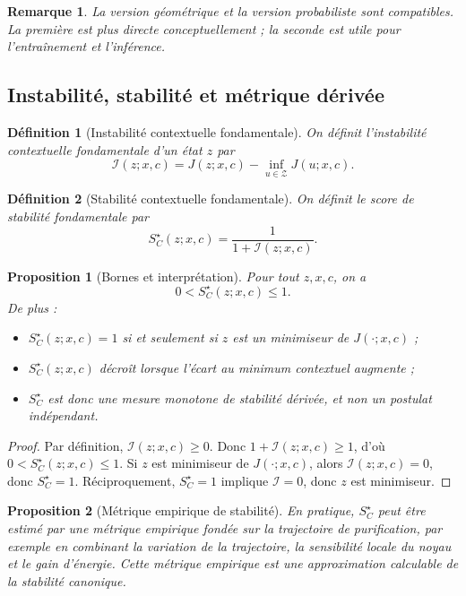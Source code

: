 \documentclass[11pt,a4paper]{article}
\newtheorem{definition}{Définition}[section]
\newtheorem{proposition}{Proposition}[section]
\newtheorem{remark}{Remarque}[section]
\newcommand{\Z}{\mathcal Z}
\newcommand{\1}{\mathbf 1}
\begin{document}
\begin{remark}
La version géométrique et la version probabiliste sont compatibles.
La première est plus directe conceptuellement ; la seconde est utile pour l'entraînement et l'inférence.
\end{remark}

\subsection{Instabilité, stabilité et métrique dérivée}

\begin{definition}[Instabilité contextuelle fondamentale]
On définit l'instabilité contextuelle fondamentale d'un état \(z\) par
\[
\mathcal I(z;x,c)
=
J(z;x,c)
-
\inf_{u\in\Z}J(u;x,c).
\]
\end{definition}

\begin{definition}[Stabilité contextuelle fondamentale]
On définit le score de stabilité fondamentale par
\[
S_C^\star(z;x,c)
=
\frac{1}{1+\mathcal I(z;x,c)}.
\]
\end{definition}

\begin{proposition}[Bornes et interprétation]
Pour tout \(z,x,c\), on a
\[
0<S_C^\star(z;x,c)\le 1.
\]
De plus :
\begin{itemize}[leftmargin=2em]
    \item \(S_C^\star(z;x,c)=1\) si et seulement si \(z\) est un minimiseur de \(J(\cdot;x,c)\) ;
    \item \(S_C^\star(z;x,c)\) décroît lorsque l'écart au minimum contextuel augmente ;
    \item \(S_C^\star\) est donc une mesure monotone de stabilité dérivée, et non un postulat indépendant.
\end{itemize}
\end{proposition}

\begin{proof}
Par définition, \(\mathcal I(z;x,c)\ge 0\). Donc \(1+\mathcal I(z;x,c)\ge 1\), d'où
\(0<S_C^\star(z;x,c)\le 1\).
Si \(z\) est minimiseur de \(J(\cdot;x,c)\), alors \(\mathcal I(z;x,c)=0\), donc \(S_C^\star=1\).
Réciproquement, \(S_C^\star=1\) implique \(\mathcal I=0\), donc \(z\) est minimiseur.
\end{proof}

\begin{proposition}[Métrique empirique de stabilité]
En pratique, \(S_C^\star\) peut être estimé par une métrique empirique fondée sur la trajectoire de purification,
par exemple en combinant la variation de la trajectoire, la sensibilité locale du noyau et le gain d'énergie.
Cette métrique empirique est une approximation calculable de la stabilité canonique.
\end{proposition}
\end{document}
